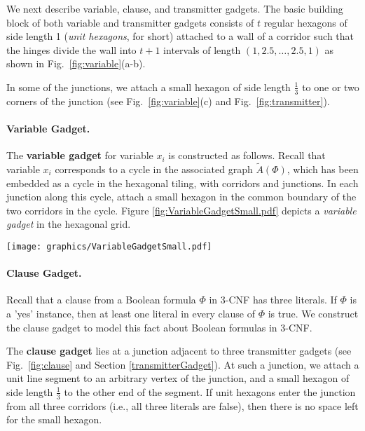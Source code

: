 \documentclass[10pt]{CSUNthesis}
\theoremstyle{plain}%
\theoremstyle{definition}
\theoremstyle{remark}
\begin{document}
We next describe variable, clause, and transmitter gadgets.
The basic building block of both variable and transmitter gadgets consists of $t$ regular hexagons of side length 1 (\emph{unit hexagons}, for short) attached to a wall of a corridor such that the hinges divide the wall into $t+1$ intervals of length $(1,2.5,\ldots ,2.5,1)$ as shown in Fig.~\ref{fig:variable}(a-b). 

In some of the junctions, we attach a small hexagon of side length $\frac{1}{3}$ to one or two corners of the junction (see Fig.~\ref{fig:variable}(c) and Fig.~\ref{fig:transmitter}). 

\paragraph{Variable Gadget.}
The {\bf variable gadget} for variable $x_i$ is constructed as follows. 
Recall that variable $x_i$ corresponds to a cycle in the associated graph $\tilde{A}(\Phi)$, which has been embedded as a cycle in the hexagonal tiling, with corridors and junctions. 
In each junction along this cycle, attach a small hexagon in the common boundary of the two corridors in the cycle. 
Figure \ref{fig:VariableGadgetSmall.pdf} depicts a \textit{variable gadget} in the hexagonal grid.

\begin{minipage}{\linewidth}
\begin{center}
\texttt{[image: graphics/VariableGadgetSmall.pdf]}
\label{fig:VariableGadgetSmall.pdf}
\end{center}
\end{minipage}

\paragraph{Clause Gadget.}
Recall that a clause from a Boolean formula $\Phi$ in 3-CNF has three literals.  If $\Phi$ is a  'yes' instance, then at least one literal in every clause of $\Phi$ is true.  We construct the clause gadget to model this fact about Boolean formulas in 3-CNF.

The {\bf clause gadget} lies at a junction adjacent to three transmitter gadgets (see Fig.~\ref{fig:clause} and Section \ref{transmitterGadget}). 
At such a junction, we attach a unit line segment to an arbitrary vertex of the junction, and a small hexagon of side length $\frac{1}{3}$ to the other end of the segment. 
If unit hexagons enter the junction from all three corridors (i.e., all three literals are false), then there is no space left for the small hexagon. 
\end{document}
